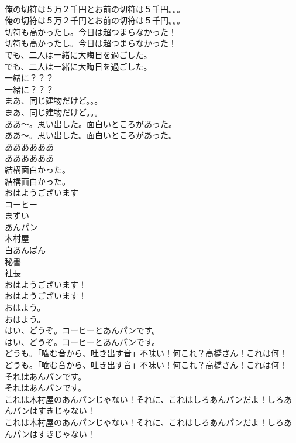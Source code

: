 \documentclass[8pt]{extreport}
\begin{document}
\begin{CJK}{UTF8}{min}
\\	俺の切符は５万２千円とお前の切符は５千円。。。	
\\	俺の切符は５万２千円とお前の切符は５千円。。。 
\\	切符も高かったし。今日は超つまらなかった！	
\\	切符も高かったし。今日は超つまらなかった！ 
\\	でも、二人は一緒に大晦日を過ごした。	
\\	でも、二人は一緒に大晦日を過ごした。 
\\	一緒に？？？	
\\	一緒に？？？ 
\\	まあ、同じ建物だけど。。。	
\\	まあ、同じ建物だけど。。。 
\\	ああ〜。思い出した。面白いところがあった。	
\\	ああ〜。思い出した。面白いところがあった。 
\\	ああああああ	
\\	ああああああ 
\\	結構面白かった。	
\\	結構面白かった。 
\\	おはようございます
\\	コーヒー
\\	まずい
\\	あんパン
\\	木村屋
\\	白あんぱん
\\	秘書
\\	社長
\\	おはようございます！	
\\	おはようございます！ 
\\	おはよう。	
\\	おはよう。 
\\	はい、どうぞ。コーヒーとあんパンです。	
\\	はい、どうぞ。コーヒーとあんパンです。 
\\	どうも。「噛む音から、吐き出す音」不味い！何これ？高橋さん！これは何！	
\\	どうも。「噛む音から、吐き出す音」不味い！何これ？高橋さん！これは何！ 
\\	それはあんパンです。	
\\	それはあんパンです。 
\\	これは木村屋のあんパンじゃない！それに、これはしろあんパンだよ！しろあんパンはすきじゃない！	
\\	これは木村屋のあんパンじゃない！それに、これはしろあんパンだよ！しろあんパンはすきじゃない！ 

\end{CJK}
\end{document}
